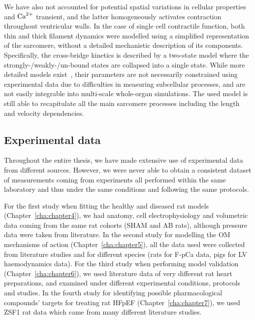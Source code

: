 \vspace{0.2cm}
We have also not accounted for potential spatial variations in cellular properties and $\textrm{Ca}^{2+}$ transient, and the latter homogeneously activates contraction throughout ventricular walls. In the case of single cell contractile function, both thin and thick filament dynamics were modelled using a simplified representation of the sarcomere, without a detailed mechanistic description of its components. Specifically, the cross-bridge kinetics is described by a two-state model where the strongly-/weakly-/un-bound states are collapsed into a single state. While more detailed models exist~\cite{Land:2015}, their parameters are not necessarily constrained using experimental data due to difficulties in measuring subcellular processes, and are not easily integrable into multi-scale whole-organ simulations. The used model is still able to recapitulate all the main sarcomere processes including the length and velocity dependencies.


%
%
%
\subsection{Experimental data}\label{sec:ch9experimental_data}
Throughout the entire thesis, we have made extensive use of experimental data from different sources. However, we were never able to obtain a consistent dataset of measurements coming from experiments all performed within the same laboratory and thus under the same conditions and following the same protocols.

\vspace{0.2cm}
For the first study when fitting the healthy and diseased rat models (Chapter~\ref{cha:chapter4}), we had anatomy, cell electrophysiology and volumetric data coming from the same rat cohorts (SHAM and AB rats), although pressure data were taken from literature. In the second study for modelling the OM mechanisms of action (Chapter~\ref{cha:chapter5}), all the data used were collected from literature studies and for different species (rats for F-pCa data, pigs for LV haemodynamics data). For the third study when performing model validation (Chapter~\ref{cha:chapter6}), we used literature data of very different rat heart preparations, and examined under different experimental conditions, protocols and studies. In the fourth study for identifying possible pharmacological compounds' targets for treating rat HFpEF (Chapter~\ref{cha:chapter7}), we used ZSF1 rat data which came from many different literature studies.

